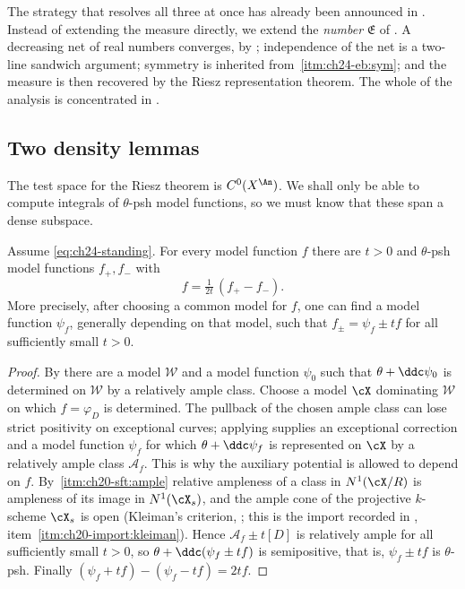 The strategy that resolves all three at once has already been announced in
.  Instead of extending the measure directly, we extend
the \emph{number} \(\mathfrak E\) of .  A
decreasing net of real numbers converges, by
; independence of the net is a two-line
sandwich argument; symmetry is inherited from
\,\cref{itm:ch24-eb:sym}; and the measure is then
recovered by the Riesz representation theorem.  The whole of the analysis is
concentrated in .

\subsection{Two density lemmas}
\label{sec:ch24-density}

The test space for the Riesz theorem is \(C^0(X^{\An})\).  We shall only be
able to compute integrals of \(\theta\)-psh model functions, so we must know
that these span a dense subspace.

\begin{lemma}
\label{lem:ch24-psh-difference}
Assume \eqref{eq:ch24-standing}.  For every model function \(f\) there are
\(t>0\) and \(\theta\)-psh model functions \(f_+,f_-\) with
\[
              f=\tfrac1{2t}\,(f_+-f_-).
\]
More precisely, after choosing a common model for \(f\), one can find a
model function \(\psi_f\), generally depending on that model, such that
\(f_\pm=\psi_f\pm tf\) for all sufficiently small \(t>0\).
\end{lemma}

\begin{proof}
By  there are a model
\(\mathcal W\) and a model function \(\psi_0\) such that
\(\theta+\ddc\psi_0\) is determined on \(\mathcal W\) by a relatively
ample class.  Choose a model \(\cX\) dominating \(\mathcal W\) on which
\(f=\varphi_D\) is determined.  The pullback of the chosen ample class can
lose strict positivity on exceptional curves; applying
 supplies an exceptional correction and a
model function \(\psi_f\) for which \(\theta+\ddc\psi_f\) is represented on
\(\cX\) by a relatively ample class \(\mathcal A_f\).  This is why the
auxiliary potential is allowed to depend on \(f\).  By
\,\cref{itm:ch20-sft:ample} relative
ampleness of a class in \(N^1(\cX/R)\) is ampleness of its image in
\(N^1(\cX_s)\), and the ample cone of the projective \(k\)-scheme
\(\cX_s\) is open (Kleiman's criterion, \cite[\S1.4]{PAG1}; this is the
import recorded in ,
item~\cref{itm:ch20-import:kleiman}).  Hence \(\mathcal A_f\pm t[D]\) is
relatively ample for all sufficiently small \(t>0\), so
\(\theta+\ddc(\psi_f\pm tf)\) is semipositive, that is, \(\psi_f\pm tf\) is
\(\theta\)-psh.  Finally
\((\psi_f+tf)-(\psi_f-tf)=2tf\).
\end{proof}

